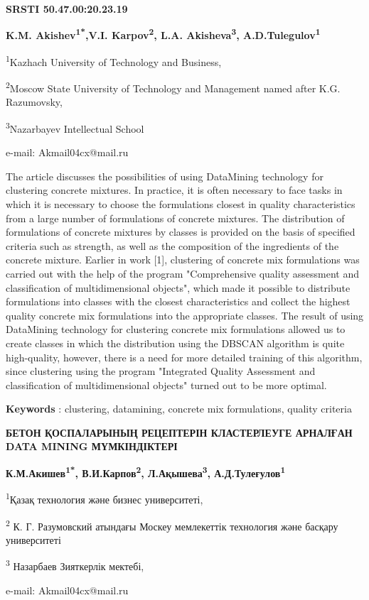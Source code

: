 \clearpage
{\bfseries SRSTI 50.47.00:20.23.19}


\begin{center}
{\bfseries K.M. Akishev\textsuperscript{1*},V.I. Karpov\textsuperscript{2},
L.A. Akisheva\textsuperscript{3}, A.D.Tulegulov\textsuperscript{1}}

\textsuperscript{1}Kazhach University of Technology and
Business,

\textsuperscript{2}Moscow State University of Technology and
Management named after K.G. Razumovsky,

\textsuperscript{3}Nazarbayev
Intellectual School

e-mail: Akmail04cx@mail.ru
\end{center}

The article discusses the possibilities of using DataMining technology
for clustering concrete mixtures. In practice, it is often necessary to
face tasks in which it is necessary to choose the formulations closest
in quality characteristics from a large number of formulations of
concrete mixtures. The distribution of formulations of concrete mixtures
by classes is provided on the basis of specified criteria such as
strength, as well as the composition of the ingredients of the concrete
mixture. Earlier in work {[}1{]}, clustering of concrete mix
formulations was carried out with the help of the program "Comprehensive
quality assessment and classification of multidimensional objects",
which made it possible to distribute formulations into classes with the
closest characteristics and collect the highest quality concrete mix
formulations into the appropriate classes. The result of using
DataMining technology for clustering concrete mix formulations allowed
us to create classes in which the distribution using the DBSCAN
algorithm is quite high-quality, however, there is a need for more
detailed training of this algorithm, since clustering using the program
"Integrated Quality Assessment and classification of multidimensional
objects" turned out to be more optimal.

{\bfseries Keywords} : clustering, datamining, concrete mix formulations,
quality criteria

\begin{center}
{\large\bfseries БЕТОН ҚОСПАЛАРЫНЫҢ РЕЦЕПТЕРІН КЛАСТЕРЛЕУГЕ АРНАЛҒАН DATA MINING
МҮМКІНДІКТЕРІ}

\vspace{1em}
{\bfseries К.М.Акишев\textsuperscript{1*}, В.И.Карпов\textsuperscript{2},
Л.Ақышева\textsuperscript{3}, А.Д.Тулеғулов\textsuperscript{1}}

\textsuperscript{1}Қазақ технология және бизнес университеті,

\textsuperscript{2} К. Г. Разумовский атындағы Москеу мемлекеттік
технология және басқару университеті

\textsuperscript{3} Назарбаев Зияткерлік мектебі,

e-mail: Akmail04cx@mail.ru
\end{center}

